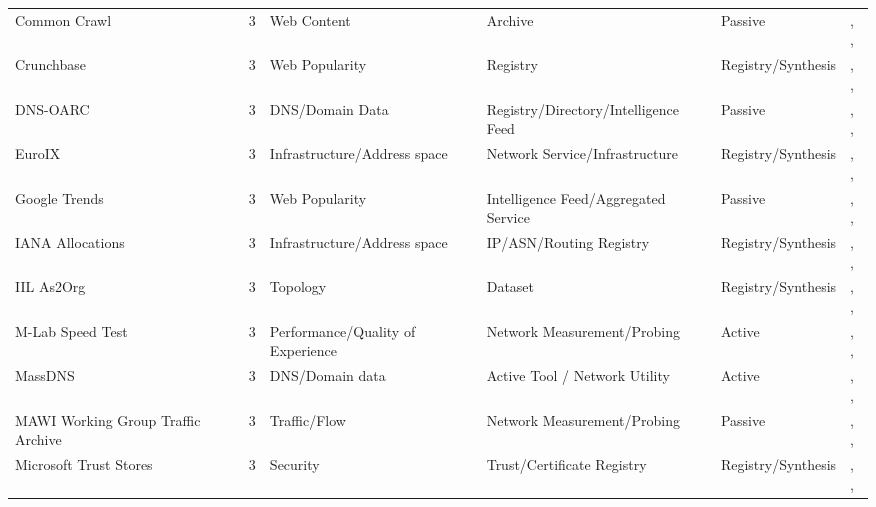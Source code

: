 \documentclass[11pt,a4paper]{article}
\begin{document}
\begin{longtable}{@{}p{}p{}p{}p{}p{}p{}p{}@{}}
Common Crawl & \cite{commoncrawl} & 3 & Web Content & Archive & Passive & \cite{10.1145/3730567.3732913}, \cite{10.1145/3517745.3561437}, \cite{10.1007/978-3-031-85960-1_9} \\
Crunchbase & \cite{crunchbase} & 3 & Web Popularity & Registry & Registry/Synthesis & \cite{10.1145/3618257.3624803}, \cite{10.1145/3487552.3487853}, \cite{10.1145/3777912.3809155} \\
DNS-OARC & \cite{dns_oarc} & 3 & DNS/Domain Data & Registry/Directory/Intelligence Feed & Passive & \cite{10.1145/3730567.3764428}, \cite{10.1007/978-3-030-72582-2_23}, \cite{10.1145/3777912.3839813} \\
EuroIX & \cite{euroix} & 3 & Infrastructure/Address space & Network Service/Infrastructure & Registry/Synthesis & \cite{10.1145/3517745.3561443}, \cite{10.1007/978-3-030-98785-5_10}, \cite{10.1007/978-3-030-98785-5_16} \\
Google Trends & \cite{google_trends} & 3 & Web Popularity & Intelligence Feed/Aggregated Service & Passive & \cite{10.1145/3618257.3624823}, \cite{10.1145/3517745.3561428}, \cite{10.1145/3777912.3839818} \\
IANA Allocations & \cite{iana-allocations} & 3 & Infrastructure/Address space & IP/ASN/Routing Registry & Registry/Synthesis & \cite{10.1145/3730567.3764452}, \cite{10.1145/3517745.3561446}, \cite{10.1145/3487552.3487825} \\
IIL As2Org & \cite{10.1007/978-3-031-28486-1_15} & 3 & Topology & Dataset & Registry/Synthesis & \cite{10.1145/3777912.3839831}, \cite{10.1145/3777912.3809155}, \cite{10.1145/3777912.3839828} \\
M-Lab Speed Test & \cite{mlab-speedtest} & 3 & Performance/Quality of Experience & Network Measurement/Probing & Active & \cite{10.1145/3517745.3561422}, \cite{10.1145/3517745.3561441}, \cite{10.1145/3487552.3487862} \\
MassDNS & \cite{massdns} & 3 & DNS/Domain data & Active Tool / Network Utility & Active & \cite{10.1007/978-3-030-98785-5_13}, \cite{10.1007/978-3-032-18268-5_5}, \cite{10.1007/978-3-032-18268-5_10} \\
MAWI Working Group Traffic Archive & \cite{mawi-archive} & 3 & Traffic/Flow & Network Measurement/Probing & Passive & \cite{10.1007/978-3-030-72582-2_32}, \cite{10.1007/978-3-030-98785-5_9}, \cite{10.1007/978-3-031-56252-5_12} \\
Microsoft Trust Stores & \cite{microsoft-trust-stores} & 3 & Security & Trust/Certificate Registry & Registry/Synthesis & \cite{10.1145/3618257.3624815}, \cite{10.1007/978-3-030-72582-2_11}, \cite{10.1007/978-3-031-28486-1_4} \\

\end{longtable}
\end{document}
